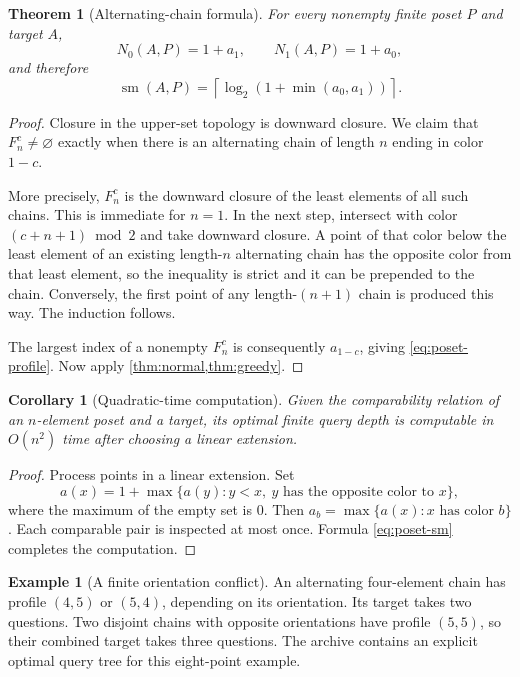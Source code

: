 \documentclass[11pt,letterpaper]{article}
\numberwithin{equation}{section}
\newtheorem{theorem}{Theorem}[section]
\newtheorem{corollary}[corollary]{Corollary}
\theoremstyle{definition}
\newtheorem{example}[example]{Example}
\theoremstyle{remark}
\theoremstyle{definition}
\newcommand{\sm}{\operatorname{sm}}
\newcommand{\ceil}[1]{\left\lceil#1\right\rceil}
\begin{document}
\begin{theorem}[Alternating-chain formula]\label{thm:posets}
For every nonempty finite poset $P$ and target $A$,
\begin{equation}\label{eq:poset-profile}
 N_0(A,P)=1+a_1,\qquad N_1(A,P)=1+a_0,
\end{equation}
and therefore
\begin{equation}\label{eq:poset-sm}
 \boxed{\ \sm(A,P)=\ceil{\log_2(1+\min(a_0,a_1))}.\ }
\end{equation}
\end{theorem}
\begin{proof}
Closure in the upper-set topology is downward closure. We claim that
$F^c_n\ne\varnothing$ exactly when there is an alternating chain of length
$n$ ending in color $1-c$.

More precisely, $F^c_n$ is the downward closure of the least elements of all
such chains. This is immediate for $n=1$. In the next step, intersect with color
$(c+n+1)\bmod2$ and take downward closure. A point of that color below the
least element of an existing length-$n$ alternating chain has the opposite
color from that least element, so the inequality is strict and it can be
prepended to the chain. Conversely, the first point of any length-$(n+1)$
chain is produced this way. The induction follows.

The largest index of a nonempty $F^c_n$ is consequently $a_{1-c}$, giving
\eqref{eq:poset-profile}. Now apply \cref{thm:normal,thm:greedy}.
\end{proof}

\begin{corollary}[Quadratic-time computation]
Given the comparability relation of an $n$-element poset and a target, its
optimal finite query depth is computable in $O(n^2)$ time after choosing a
linear extension.
\end{corollary}
\begin{proof}
Process points in a linear extension. Set
\[
 a(x)=1+\max\{a(y):y<x,\ y\text{ has the opposite color to }x\},
\]
where the maximum of the empty set is $0$. Then
$a_b=\max\{a(x):x\text{ has color }b\}$. Each comparable pair is inspected at
most once. Formula \eqref{eq:poset-sm} completes the computation.
\end{proof}

\begin{example}[A finite orientation conflict]
An alternating four-element chain has profile $(4,5)$ or $(5,4)$, depending on
its orientation. Its target takes two questions. Two disjoint chains with
opposite orientations have profile $(5,5)$, so their combined target takes
three questions. The archive contains an explicit optimal query tree for this
eight-point example.
\end{example}
\end{document}
